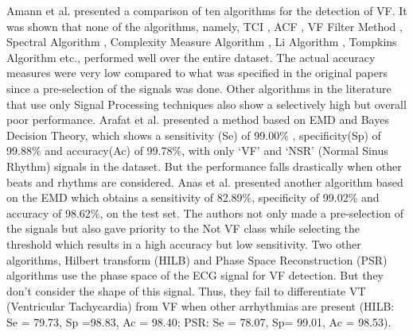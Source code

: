 \documentclass[12pt,a4paper]{article}
\begin{document}
Amann et al. \cite{amann2005reliability} presented a comparison of ten algorithms for the detection of VF. It was shown that none of the algorithms, namely, TCI \cite{thakor1990ventricular}, ACF \cite{chen1987ventricular}, VF Filter Method \cite{kuo1978computer}, Spectral Algorithm \cite{barro1989algorithmic}, Complexity Measure Algorithm \cite{zhang1999detecting}, Li Algorithm \cite{li1995detection}, Tompkins Algorithm \cite{pan1985real} etc., performed well over the entire dataset. The actual accuracy measures were very low compared to what was specified in the original papers since a pre-selection of the signals was done. Other algorithms in the literature that use only Signal Processing techniques also show a selectively high but overall poor performance. Arafat et al. \cite{arafat2009detection} presented a method based on EMD and Bayes Decision Theory, which shows a sensitivity (Se) of 99.00\% , specificity(Sp) of 99.88\% and accuracy(Ac) of 99.78\%, with only `VF' and `NSR' (Normal Sinus Rhythm) signals in the dataset. But the performance falls drastically when other beats and rhythms are considered. Anas et al. \cite{anas2011exploiting} presented another algorithm based on the EMD which obtains a sensitivity of 82.89\%, specificity of 99.02\% and accuracy of 98.62\%, on the test set. The authors not only made a pre-selection of the signals but also gave priority to the Not VF class while selecting the threshold which results in a high accuracy but low sensitivity. Two other algorithms, Hilbert transform (HILB) \cite{amann2005new} and Phase Space Reconstruction (PSR) \cite{amann2007detecting} algorithms use the phase space of the ECG signal for VF detection. But they don’t consider the shape of this signal. Thus, they fail to differentiate VT (Ventricular Tachycardia) from VF when other arrhythmias are present (HILB: Se = 79.73, Sp =98.83, Ac = 98.40; PSR: Se = 78.07, Sp= 99.01, Ac = 98.53).
\end{document}
